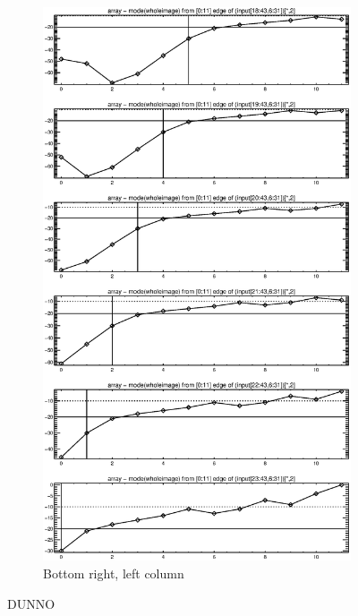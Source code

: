 \documentclass[10pt]{article}
\begin{document}
\begin{figure}[!h]
\begin{subfigure}[b]{.4\linewidth}
        \centering
        \includegraphics[width=1.4\textwidth]{plots_tables_images/botright3.eps} 
        \caption{Bottom right, left column}
    \end{subfigure}
    \caption{DUNNO}
\end{figure}
%
%
%
%
\end{document}
